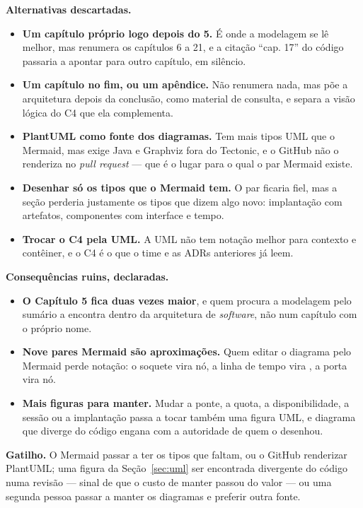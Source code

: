 \textbf{Alternativas descartadas.}

\begin{itemize}
  \item \textbf{Um capítulo próprio logo depois do 5.} É onde a modelagem se lê
    melhor, mas renumera os capítulos 6 a 21, e a citação \enquote{cap. 17} do
    código passaria a apontar para outro capítulo, em silêncio.
  \item \textbf{Um capítulo no fim, ou um apêndice.} Não renumera nada, mas põe a
    arquitetura depois da conclusão, como material de consulta, e separa a
    visão lógica do C4 que ela complementa.
  \item \textbf{PlantUML como fonte dos diagramas.} Tem mais tipos UML que o
    Mermaid, mas exige Java e Graphviz fora do Tectonic, e o GitHub não o
    renderiza no \emph{pull request} --- que é o lugar para o qual o par Mermaid
    existe.
  \item \textbf{Desenhar só os tipos que o Mermaid tem.} O par ficaria fiel, mas
    a seção perderia justamente os tipos que dizem algo novo: implantação com
    artefatos, componentes com interface e tempo.
  \item \textbf{Trocar o C4 pela UML.} A UML não tem notação melhor para contexto
    e contêiner, e o C4 é o que o time e as ADRs anteriores já leem.
\end{itemize}

\textbf{Consequências ruins, declaradas.}

\begin{itemize}
  \item \textbf{O Capítulo 5 fica duas vezes maior}, e quem procura a
    modelagem pelo sumário a encontra dentro da arquitetura de \emph{software}, não
    num capítulo com o próprio nome.
  \item \textbf{Nove pares Mermaid são aproximações.} Quem editar o diagrama pelo
    Mermaid perde notação: o soquete vira nó, a linha de tempo vira
    , a porta vira nó.
  \item \textbf{Mais figuras para manter.} Mudar a ponte, a quota, a
    disponibilidade, a sessão ou a implantação passa a tocar também uma figura
    UML, e diagrama que diverge do código engana com a autoridade de quem o
    desenhou.
\end{itemize}

\textbf{Gatilho.} O Mermaid passar a ter os tipos que faltam, ou o GitHub
renderizar PlantUML; uma figura da Seção~\ref{sec:uml} ser encontrada divergente
do código numa revisão --- sinal de que o custo de manter passou do valor --- ou
uma segunda pessoa passar a manter os diagramas e preferir outra fonte.


